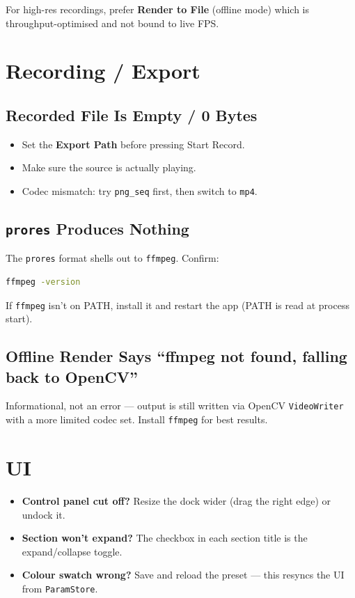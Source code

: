 \documentclass[11pt,a4paper,openany]{report}
\begin{document}
For high-res recordings, prefer \textbf{Render to File} (offline mode)
which is throughput-optimised and not bound to live FPS.

\section{Recording / Export}

\subsection{Recorded File Is Empty / 0 Bytes}

\begin{itemize}
    \item Set the \textbf{Export Path} before pressing Start Record.
    \item Make sure the source is actually playing.
    \item Codec mismatch: try \texttt{png\_seq} first, then switch to
        \texttt{mp4}.
\end{itemize}

\subsection{\texttt{prores} Produces Nothing}

The \texttt{prores} format shells out to \texttt{ffmpeg}. Confirm:

\begin{lstlisting}[language=bash]
ffmpeg -version
\end{lstlisting}

If \texttt{ffmpeg} isn't on PATH, install it and restart the app (PATH is
read at process start).

\subsection{Offline Render Says ``ffmpeg not found, falling back to OpenCV''}

Informational, not an error --- output is still written via OpenCV
\texttt{VideoWriter} with a more limited codec set. Install \texttt{ffmpeg}
for best results.

\section{UI}

\begin{itemize}
    \item \textbf{Control panel cut off?} Resize the dock wider (drag the
        right edge) or undock it.
    \item \textbf{Section won't expand?} The checkbox in each section title
        is the expand/collapse toggle.
    \item \textbf{Colour swatch wrong?} Save and reload the preset --- this
        resyncs the UI from \texttt{ParamStore}.
\end{itemize}
\end{document}
